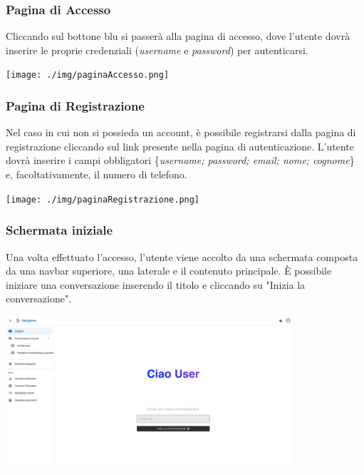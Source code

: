 \subsubsection{Pagina di Accesso}
Cliccando sul bottone blu si passerà alla pagina di accesso, dove l'utente dovrà inserire le proprie credenziali (\textit{username} e \textit{password}) per autenticarsi.
\begin{center}
    \texttt{[image: ./img/paginaAccesso.png]}
\end{center}

\subsubsection{Pagina di Registrazione}
Nel caso in cui non si possieda un account, è possibile registrarsi dalla pagina di registrazione cliccando sul link presente nella pagina di autenticazione. L'utente dovrà inserire i campi obbligatori \{\textit{username; password; email; nome; cognome}\} e, facoltativamente, il numero di telefono.
\begin{center}
    \texttt{[image: ./img/paginaRegistrazione.png]}
\end{center}

\subsubsection{Schermata iniziale}
Una volta effettuato l'accesso, l'utente viene accolto da una schermata composta da una navbar superiore, una laterale e il contenuto principale. È possibile iniziare una conversazione inserendo il titolo e cliccando su "Inizia la conversazione".
\begin{center}
    \includegraphics[width=0.8\textwidth]{./img/paginaIniziale.png}
\end{center}
\newpage

